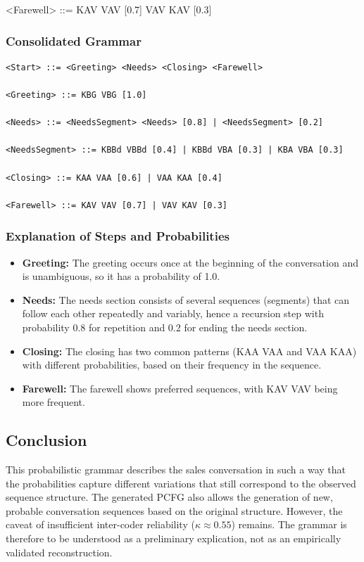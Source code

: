 \documentclass[
]{article}
\begin{document}
\textless Farewell\textgreater{} ::= KAV VAV [0.7] \textbar{} VAV KAV [0.3]

\subsubsection{Consolidated Grammar}\label{consolidated-grammar}

\begin{verbatim}
<Start> ::= <Greeting> <Needs> <Closing> <Farewell>

<Greeting> ::= KBG VBG [1.0]

<Needs> ::= <NeedsSegment> <Needs> [0.8] | <NeedsSegment> [0.2]

<NeedsSegment> ::= KBBd VBBd [0.4] | KBBd VBA [0.3] | KBA VBA [0.3]

<Closing> ::= KAA VAA [0.6] | VAA KAA [0.4]

<Farewell> ::= KAV VAV [0.7] | VAV KAV [0.3]
\end{verbatim}

\subsubsection{Explanation of Steps and Probabilities}\label{explanation-of-steps-and-probabilities}

\begin{itemize}
\item \textbf{Greeting:} The greeting occurs once at the beginning of the conversation and is unambiguous, so it has a probability of 1.0.
\item \textbf{Needs:} The needs section consists of several sequences (segments) that can follow each other repeatedly and variably, hence a recursion step with probability 0.8 for repetition and 0.2 for ending the needs section.
\item \textbf{Closing:} The closing has two common patterns (KAA VAA and VAA KAA) with different probabilities, based on their frequency in the sequence.
\item \textbf{Farewell:} The farewell shows preferred sequences, with KAV VAV being more frequent.
\end{itemize}

\subsection{Conclusion}\label{conclusion}

This probabilistic grammar describes the sales conversation in such a way that the probabilities capture different variations that still correspond to the observed sequence structure. The generated PCFG also allows the generation of new, probable conversation sequences based on the original structure. However, the caveat of insufficient inter-coder reliability (\(\kappa \approx 0.55\)) remains. The grammar is therefore to be understood as a preliminary explication, not as an empirically validated reconstruction.
\end{document}

